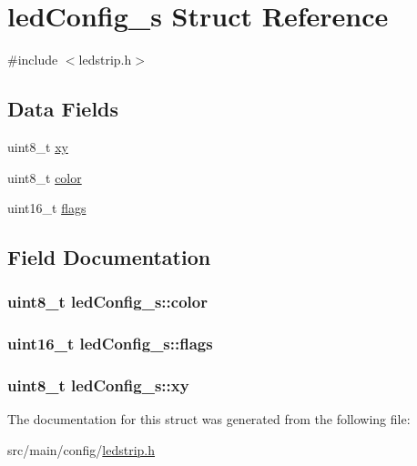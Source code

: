 \hypertarget{structledConfig__s}{\section{led\+Config\+\_\+s Struct Reference}
\label{structledConfig__s}
}


{\ttfamily \#include $<$ledstrip.\+h$>$}

\subsection*{Data Fields}
\begin{DoxyCompactItemize}
\item 
uint8\+\_\+t \hyperlink{structledConfig__s_a9b66bb27f52b71f7f270fe8b3e059cfc}{xy}
\item 
uint8\+\_\+t \hyperlink{structledConfig__s_af8e5d9b15f175c5f1f205dff1786d43c}{color}
\item 
uint16\+\_\+t \hyperlink{structledConfig__s_a4744b9c0a39f2cd29ea3ce2192b47c8f}{flags}
\end{DoxyCompactItemize}


\subsection{Field Documentation}
\hypertarget{structledConfig__s_af8e5d9b15f175c5f1f205dff1786d43c}{
\subsubsection[{color}]{\setlength{\rightskip}{0pt plus 5cm}uint8\+\_\+t led\+Config\+\_\+s\+::color}}\label{structledConfig__s_af8e5d9b15f175c5f1f205dff1786d43c}
\hypertarget{structledConfig__s_a4744b9c0a39f2cd29ea3ce2192b47c8f}{
\subsubsection[{flags}]{\setlength{\rightskip}{0pt plus 5cm}uint16\+\_\+t led\+Config\+\_\+s\+::flags}}\label{structledConfig__s_a4744b9c0a39f2cd29ea3ce2192b47c8f}
\hypertarget{structledConfig__s_a9b66bb27f52b71f7f270fe8b3e059cfc}{
\subsubsection[{xy}]{\setlength{\rightskip}{0pt plus 5cm}uint8\+\_\+t led\+Config\+\_\+s\+::xy}}\label{structledConfig__s_a9b66bb27f52b71f7f270fe8b3e059cfc}


The documentation for this struct was generated from the following file\+:\begin{DoxyCompactItemize}
\item 
src/main/config/\hyperlink{config_2ledstrip_8h}{ledstrip.\+h}\end{DoxyCompactItemize}
